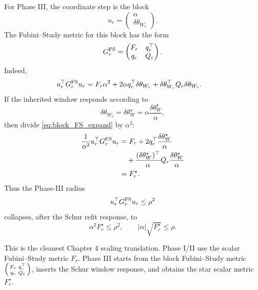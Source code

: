 \documentclass[10pt,twocolumn]{article}
\begin{document}
For Phase III, the coordinate step is the block
\begin{equation}
u_r=
\begin{pmatrix}
\alpha\\
\delta\theta_{W_r}
\end{pmatrix}.
\label{eq:block_step_metric}
\end{equation}
The Fubini--Study metric for this block has the form
\begin{equation}
G_r^{\rm FS}
=
\begin{pmatrix}
F_r&q_r^\top\\
q_r&Q_r
\end{pmatrix}.
\label{eq:block_FS_metric}
\end{equation}
Indeed,
\begin{align}
u_r^\top G_r^{\rm FS}u_r
&=
F_r\alpha^2
+2\alpha q_r^\top\delta\theta_{W_r}
+\delta\theta_{W_r}^\top Q_r\delta\theta_{W_r}.
\label{eq:block_FS_expand}
\end{align}
If the inherited window responds according to
\begin{equation}
\delta\theta_{W_r}=\delta\theta_W^\star
=\alpha\frac{\delta\theta_W^\star}{\alpha},
\label{eq:block_response_metric}
\end{equation}
then divide \eqref{eq:block_FS_expand} by \(\alpha^2\):
\begin{align}
\frac{1}{\alpha^2}u_r^\top G_r^{\rm FS}u_r
&=
F_r
+2q_r^\top\frac{\delta\theta_W^\star}{\alpha}
\notag\\
&\quad
+\frac{(\delta\theta_W^\star)^\top}{\alpha}
Q_r
\frac{\delta\theta_W^\star}{\alpha}
\notag\\
&=F_r^\star.
\label{eq:block_metric_to_Fstar}
\end{align}
Thus the Phase-III radius
\begin{equation}
u_r^\top G_r^{\rm FS}u_r\le\rho^2
\label{eq:block_radius}
\end{equation}
collapses, after the Schur refit response, to
\begin{equation}
\alpha^2F_r^\star\le\rho^2,
\qquad
|\alpha|\sqrt{F_r^\star}\le\rho.
\label{eq:block_radius_star}
\end{equation}

\begin{paperbox}
This is the cleanest Chapter 4 scaling translation. Phase I/II use the scalar Fubini--Study metric \(F_r\). Phase III starts from the block Fubini--Study metric \(\begin{psmallmatrix}F_r&q_r^\top\\ q_r&Q_r\end{psmallmatrix}\), inserts the Schur window response, and obtains the star scalar metric \(F_r^\star\).
\end{paperbox}
\end{document}

